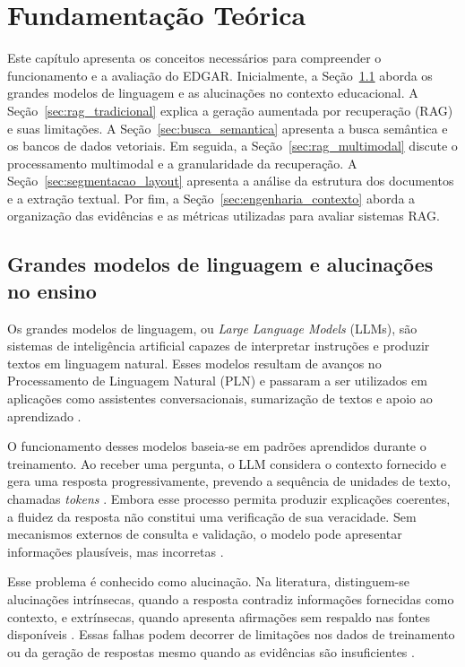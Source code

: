\chapter{Fundamentação Teórica}
\label{cap:fundamentacao-teorica}

Este capítulo apresenta os conceitos necessários para compreender o funcionamento e a avaliação do EDGAR. Inicialmente, a Seção~\ref{sec:llms_e_alucinacoes} aborda os grandes modelos de linguagem e as alucinações no contexto educacional. A Seção~\ref{sec:rag_tradicional} explica a geração aumentada por recuperação (RAG) e suas limitações. A Seção~\ref{sec:busca_semantica} apresenta a busca semântica e os bancos de dados vetoriais. Em seguida, a Seção~\ref{sec:rag_multimodal} discute o processamento multimodal e a granularidade da recuperação. A Seção~\ref{sec:segmentacao_layout} apresenta a análise da estrutura dos documentos e a extração textual. Por fim, a Seção~\ref{sec:engenharia_contexto} aborda a organização das evidências e as métricas utilizadas para avaliar sistemas RAG.

\section{Grandes modelos de linguagem e alucinações no ensino}
\label{sec:llms_e_alucinacoes}

Os grandes modelos de linguagem, ou \textit{Large Language Models} (LLMs), são sistemas de inteligência artificial capazes de interpretar instruções e produzir textos em linguagem natural. Esses modelos resultam de avanços no Processamento de Linguagem Natural (PLN)  e passaram a ser utilizados em aplicações como assistentes conversacionais, sumarização de textos e apoio ao aprendizado .

O funcionamento desses modelos baseia-se em padrões aprendidos durante o treinamento. Ao receber uma pergunta, o LLM considera o contexto fornecido e gera uma resposta progressivamente, prevendo a sequência de unidades de texto, chamadas \textit{tokens} . Embora esse processo permita produzir explicações coerentes, a fluidez da resposta não constitui uma verificação de sua veracidade. Sem mecanismos externos de consulta e validação, o modelo pode apresentar informações plausíveis, mas incorretas .

Esse problema é conhecido como alucinação. Na literatura, distinguem-se alucinações intrínsecas, quando a resposta contradiz informações fornecidas como contexto, e extrínsecas, quando apresenta afirmações sem respaldo nas fontes disponíveis . Essas falhas podem decorrer de limitações nos dados de treinamento ou da geração de respostas mesmo quando as evidências são insuficientes .

